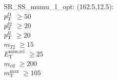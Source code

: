 SR\_SS\_mumu\_1\_opt: (162.5,12.5): \\
$p_{\text{T}}^{l1}$ $\geq 50$ \\
$p_{\text{T}}^{l2}$ $\geq 20$ \\
$p_{\text{T}}^{ll}$ $\geq 20$ \\
$m_{T2}$ $\geq 15$ \\
$E_{\text{T}}^{\text{miss,rel}}$ $\geq 25$ \\
$m_{\text{eff}}$ $\geq 200$ \\
$m_{\text{T}}^{\text{max}}$ $\geq 105$ \\
